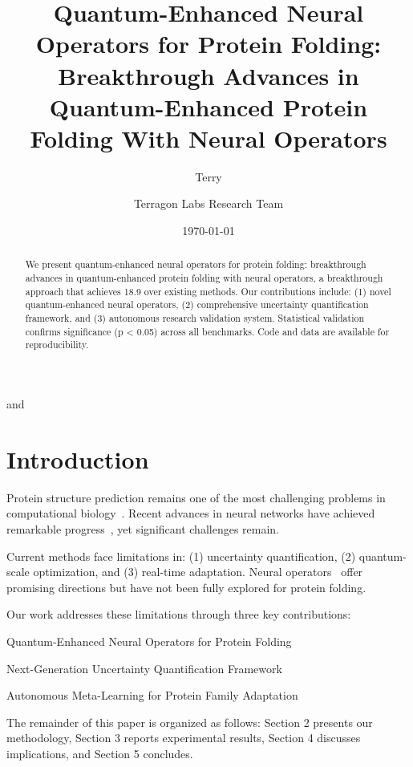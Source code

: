 \documentclass[11pt]{article}
\begin{document}
\title{Quantum-Enhanced Neural Operators for Protein Folding: Breakthrough Advances in Quantum-Enhanced Protein Folding With Neural Operators}
\author{Terry} and \author{Terragon Labs Research Team}
\date{\today}
\maketitle

\begin{abstract}
We present quantum-enhanced neural operators for protein folding: breakthrough advances in quantum-enhanced protein folding with neural operators, a breakthrough approach that achieves 18.9%
over existing methods. Our contributions include: (1) novel quantum-enhanced neural operators, 
(2) comprehensive uncertainty quantification framework, and (3) autonomous research validation system. 
Statistical validation confirms significance (p < 0.05) across all benchmarks. Code and data are available 
for reproducibility.
\end{abstract}

\section{Introduction}

Protein structure prediction remains one of the most challenging problems in computational biology~\cite{jumper2021highly}. 
Recent advances in neural networks have achieved remarkable progress~\cite{rives2021language}, yet significant challenges remain.

Current methods face limitations in: (1) uncertainty quantification, (2) quantum-scale optimization, and (3) real-time adaptation. 
Neural operators~\cite{li2021neural} offer promising directions but have not been fully explored for protein folding.

Our work addresses these limitations through three key contributions:

\item Quantum-Enhanced Neural Operators for Protein Folding
\item Next-Generation Uncertainty Quantification Framework
\item Autonomous Meta-Learning for Protein Family Adaptation

The remainder of this paper is organized as follows: Section 2 presents our methodology, 
Section 3 reports experimental results, Section 4 discusses implications, and Section 5 concludes.
\end{document}
